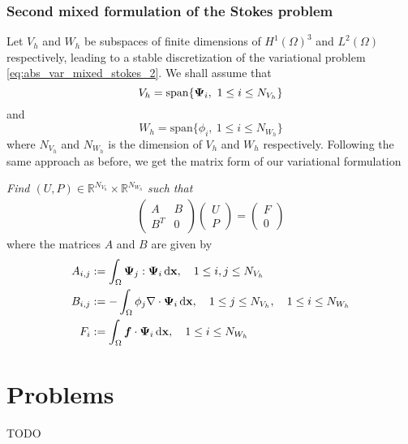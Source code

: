 \subsubsection*{Second mixed formulation of the Stokes problem}
%
Let $V_h$ and $W_h$ be subspaces of finite dimensions of $H^1(\Omega)^3$ and $L^2(\Omega)$ respectively, leading to a stable discretization of the variational problem \eqref{eq:abs_var_mixed_stokes_2}.
We shall assume that 
$$V_h = \mathrm{span}\{ \boldsymbol{\Psi}_{i}, ~ 1 \leq i \leq N_{V_h} \}$$ 
and
$$W_h = \mathrm{span}\{ \phi_{i}, ~ 1 \leq i \leq N_{W_h} \}$$ 
where $N_{V_h}$ and $N_{W_h}$ is the dimension of $V_h$ and $W_h$ respectively.
Following the same approach as before, we get the matrix form of our variational formulation
\begin{tcolorbox}
  {\em Find $(U,P) \in \mathbb{R}^{N_{V_h}} \times \mathbb{R}^{N_{W_h}}$ such that}
  \begin{align}
    \begin{pmatrix}
      A   & B \\
      B^T & 0 
    \end{pmatrix}
    \begin{pmatrix} U \\ P \end{pmatrix}
    = \begin{pmatrix} F \\ 0 \end{pmatrix}
  \end{align}
  where the matrices $A$ and $B$ are given by
  \begin{align*}
    A_{i, j} &:= \int_{\Omega} \boldsymbol{\Psi}_{j} : \boldsymbol{\Psi}_{i} \,{\rm d} \mathbf{x}  
    ,  \quad 1 \leq i, j \leq N_{V_h}
    \\
    B_{i, j} &:= - \int_{\Omega} \phi_{j} \nabla \cdot \boldsymbol{\Psi}_{i} \,{\rm d} \mathbf{x}  
    ,  \quad 1 \leq j \leq N_{V_h} 
    , \quad 1 \leq i \leq N_{W_h} 
    \\
    F_{i} &:= \int_{\Omega} \bm{f} \cdot \boldsymbol{\Psi}_{i} \,{\rm d} \mathbf{x} 
    , \quad 1 \leq i \leq N_{W_h} 
  \end{align*}
  \label{tcb:mixed_stokes_2}
\end{tcolorbox}

\section{Problems}
\label{sec:fem-abstract-problems}
TODO


